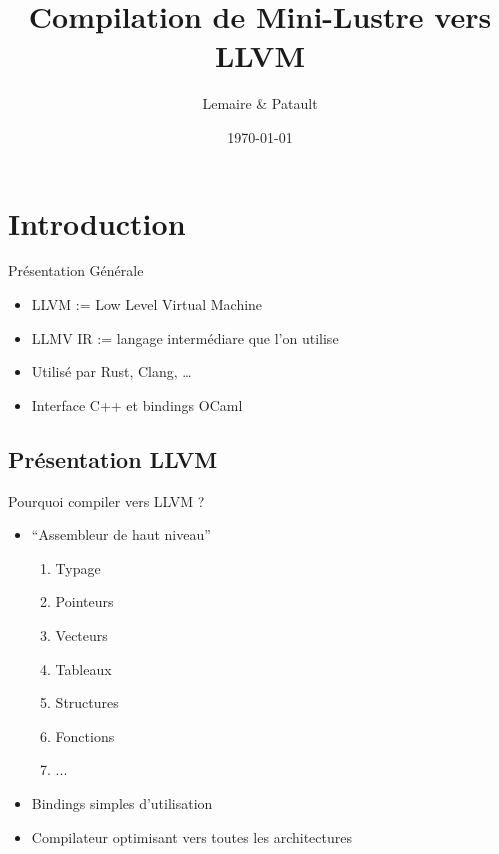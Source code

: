 \documentclass{beamer} %
\title[Mini-Lustre $\mapsto$ LLVM]{Compilation de Mini-Lustre vers LLVM}
\institute[UPSaclay]{Université Paris-Saclay}
\author{Lemaire \& Patault}
\date{\today}
\begin{document}

\begin{frame}
    \titlepage
\end{frame}

\section{Introduction}

\begin{frame}
    \tableofcontents[currentsection]
\end{frame}

\begin{frame}[fragile]{Présentation Générale}
            \vfill
    \begin{itemize}
        \item LLVM := Low Level Virtual Machine

        \vfill\item LLMV IR := langage intermédiare que l'on utilise

        \vfill\item Utilisé par Rust, Clang, \ldots

        \vfill\item Interface C++ et bindings OCaml
    \end{itemize}
            \vfill
\end{frame}

\subsection{Présentation LLVM}

\begin{frame}{Pourquoi compiler vers LLVM ?}
    \vfill
    \begin{itemize}
        \item “Assembleur de haut niveau”
        \begin{enumerate}
            \item Typage
            \item Pointeurs
            \item Vecteurs
            \item Tableaux
            \item Structures
            \item Fonctions
            \item ...
        \end{enumerate}
    \vfill \item Bindings simples d'utilisation
    \vfill \item Compilateur optimisant vers toutes les architectures
    \end{itemize}
    \vfill
\end{frame}
\end{document}

